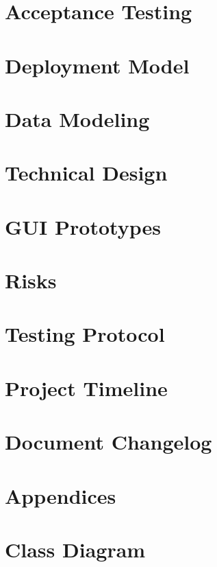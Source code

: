 \documentclass{article}
\begin{document}
	\section{Acceptance Testing}
	
	\pagebreak
	
	\section{Deployment Model}
	
	\pagebreak
	
	\section{Data Modeling}
	
	\pagebreak
	
	\section{Technical Design}
	
	\pagebreak
	
	\section{GUI Prototypes}
	
	\pagebreak
	
	\section{Risks}
	
	\pagebreak
	
	\section{Testing Protocol}
	
	\pagebreak
	
	\section{Project Timeline}
	
	\pagebreak
	
	\section{Document Changelog}
	
	\pagebreak
	
	\appendix
	\section*{Appendices}
	\section{Class Diagram}
\end{document}
